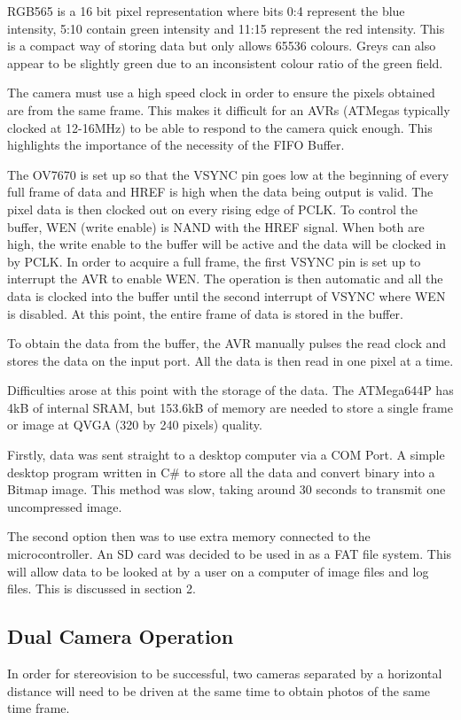 RGB565 is a 16 bit pixel representation where bits 0:4 represent the blue intensity, 5:10 contain green intensity and 11:15 represent the red intensity. This is a compact way of storing data but only allows 65536 colours. Greys can also appear to be slightly green due to an inconsistent colour ratio of the green field. 

The camera must use a high speed clock in order to ensure the pixels obtained are from the same frame. This makes it difficult for an AVRs (ATMegas typically clocked at 12-16MHz) to be able to respond to the camera quick enough. This highlights the importance of the necessity of the FIFO Buffer. 

The OV7670 is set up so that the VSYNC pin goes low at the beginning of every full frame of data and HREF is high when the data being output is valid. The pixel data is then clocked out on every rising edge of PCLK. To control the buffer, WEN (write enable) is NAND with the HREF signal. When both are high, the write enable to the buffer will be active and the data will be clocked in by PCLK. In order to acquire a full frame, the first VSYNC pin is set up to interrupt the AVR to enable WEN. The operation is then automatic and all the data is clocked into the buffer until the second interrupt of VSYNC where WEN is disabled. At this point, the entire frame of data is stored in the buffer.

To obtain the data from the buffer, the AVR manually pulses the read clock and stores the data on the input port. All the data is then read in one pixel at a time. 

Difficulties arose at this point with the storage of the data. The ATMega644P has 4kB of internal SRAM, but  153.6kB of memory are needed to store a single frame or image at QVGA (320 by 240 pixels) quality. 

Firstly, data was sent straight to a desktop computer via a COM Port. A simple desktop program written in C\# to store all the data and convert binary into a Bitmap image. This method was slow, taking around 30 seconds to transmit one uncompressed image. 

The second option then was to use extra memory connected to the microcontroller. An SD card was decided to be used in as a FAT file system. This will allow data to be looked at by a user on a computer of image files and log files. This is discussed in section 2. 

\subsection{Dual Camera Operation}
In order for stereovision to be successful, two cameras separated by a horizontal distance will need to be driven at the same time to obtain photos of the same time frame. 

